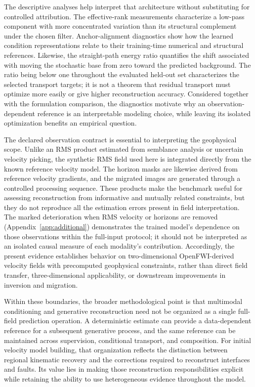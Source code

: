 The descriptive analyses help interpret that architecture without substituting for controlled attribution. The effective-rank measurements characterize a low-pass component with more concentrated variation than its structural complement under the chosen filter. Anchor-alignment diagnostics show how the learned condition representations relate to their training-time numerical and structural references. Likewise, the straight-path energy ratio quantifies the shift associated with moving the stochastic base from zero toward the predicted background. The ratio being below one throughout the evaluated held-out set characterizes the selected transport targets; it is not a theorem that residual transport must optimize more easily or give higher reconstruction accuracy. Considered together with the formulation comparison, the diagnostics motivate why an observation-dependent reference is an interpretable modeling choice, while leaving its isolated optimization benefits an empirical question.

The declared observation contract is essential to interpreting the geophysical scope. Unlike an RMS product estimated from semblance analysis or uncertain velocity picking, the synthetic RMS field used here is integrated directly from the known reference velocity model. The horizon masks are likewise derived from reference velocity gradients, and the migrated images are generated through a controlled processing sequence. These products make the benchmark useful for assessing reconstruction from informative and mutually related constraints, but they do not reproduce all the estimation errors present in field interpretation. The marked deterioration when RMS velocity or horizons are removed (Appendix~\ref{app:additional}) demonstrates the trained model's dependence on those observations within the full-input protocol; it should not be interpreted as an isolated causal measure of each modality's contribution. Accordingly, the present evidence establishes behavior on two-dimensional OpenFWI-derived velocity fields with precomputed geophysical constraints, rather than direct field transfer, three-dimensional applicability, or downstream improvements in inversion and migration.

Within these boundaries, the broader methodological point is that multimodal conditioning and generative reconstruction need not be organized as a single full-field prediction operation. A deterministic estimate can provide a data-dependent reference for a subsequent generative process, and the same reference can be maintained across supervision, conditional transport, and composition. For initial velocity model building, that organization reflects the distinction between regional kinematic recovery and the corrections required to reconstruct interfaces and faults. Its value lies in making those reconstruction responsibilities explicit while retaining the ability to use heterogeneous evidence throughout the model.
